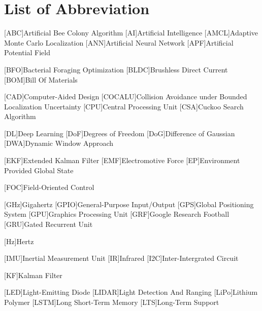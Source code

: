 \section*{List of Abbreviation} %


\begin{acronym}[HBCI]
	[ABC]{Artificial Bee Colony Algorithm}
	[AI]{Artificial Intelligence}
	[AMCL]{Adaptive Monte Carlo Localization}
	[ANN]{Artificial Neural Network}
	[APF]{Artificial Potential Field}

	[BFO]{Bacterial Foraging Optimization}
	[BLDC]{Brushless Direct Current}
	[BOM]{Bill Of Materials}

	[CAD]{Computer-Aided Design}
	[COCALU]{Collision Avoidance under Bounded Localization Uncertainty}
	[CPU]{Central Processing Unit}
	[CSA]{Cuckoo Search Algorithm}

	[DL]{Deep Learning}
	[DoF]{Degrees of Freedom}
	[DoG]{Difference of Gaussian}
	[DWA]{Dynamic Window Approach}

	[EKF]{Extended Kalman Filter}
	[EMF]{Electromotive Force}
	[EP]{Environment Provided Global State}

	[FOC]{Field-Oriented Control}

	[GHz]{Gigahertz}
	[GPIO]{General-Purpose Input/Output}
	[GPS]{Global Positioning System}
	[GPU]{Graphics Processing Unit}
	[GRF]{Google Research Football}
	[GRU]{Gated Recurrent Unit}

	[Hz]{Hertz}

	[IMU]{Inertial Measurement Unit}
	[IR]{Infrared}
	[I2C]{Inter-Intergrated Circuit}


	[KF]{Kalman Filter}

	[LED]{Light-Emitting Diode}
	[LIDAR]{Light Detection And Ranging}
	[LiPo]{Lithium Polymer}
	[LSTM]{Long Short-Term Memory}
	[LTS]{Long-Term Support}


\end{acronym}
